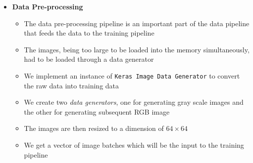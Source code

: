 \documentclass[oneside,a4paper,12pt]{report}
\begin{document}
\begin{itemize}
	\item \textbf{Data Pre-processing}
	\begin{itemize}
		\item The data pre-processing pipeline is an important part of the data pipeline that feeds the data to the training pipeline
		\item The images, being too large to be loaded into the memory simultaneously, had to be loaded through a data generator
		\item We implement an instance of \texttt{Keras Image Data Generator} to convert the raw data into training data
		\item We create two \textit{data generators}, one for generating gray scale images and the other for generating subsequent RGB image
		\item The images are then resized to a dimension of $64 \times 64$ 
		\item We get a vector of image batches which will be the input to the training pipeline
	\end{itemize}
	

\end{itemize}
\end{document}
